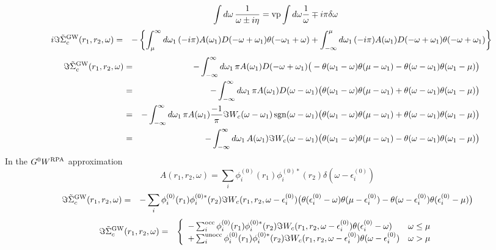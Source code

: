 \documentclass[fleqn]{article}
\begin{document}
\[
  \qquad
    \int d\omega \, \frac{1}{\omega \pm i\eta} = {\rm vp} \int d\omega \frac{1}{\omega} \mp i \pi \delta{\omega}
\]
\begin{eqnarray*}
  \quad
  i \Im \tilde{\Sigma}^{\rm GW}_c(r_1,r_2,\omega) &=& - \left\{
  \int^{\infty}_{\mu} d\omega_1 \, (-i \pi) A(\omega_1) D(-\omega+\omega_1) \theta(-\omega_1+\omega) +
  \int^\mu_{-\infty} d\omega_1 \, (-i \pi) A(\omega_1) D(-\omega+\omega_1) \theta(-\omega+\omega_1) \right\}
\end{eqnarray*}
\begin{eqnarray*}
  \quad
  \Im \tilde{\Sigma}^{\rm GW}_c(r_1,r_2,\omega) &=& -
  \int_{-\infty}^\infty d\omega_1 \, \pi A(\omega_1) D(-\omega+\omega_1)
  \big(
  -\theta(\omega_1-\omega) \theta(\mu-\omega_1) - \theta(\omega-\omega_1) \theta(\omega_1-\mu)
  \big)
  \\ &=& -
  \int_{-\infty}^\infty d\omega_1 \, \pi A(\omega_1) D(\omega-\omega_1)
  \big(
  \theta(\omega_1-\omega) \theta(\mu-\omega_1) + \theta(\omega-\omega_1) \theta(\omega_1-\mu)
  \big)
  \\ &=&
  - \int_{-\infty}^\infty d\omega_1 \, \pi A(\omega_1)
  \frac{-1}{\pi} \Im W_c(\omega-\omega_1) \mathrm{\, sgn}(\omega-\omega_1)
  \big(
  \theta(\omega_1-\omega) \theta(\mu-\omega_1) + \theta(\omega-\omega_1) \theta(\omega_1-\mu)
  \big)
  \\ &=&
  - \int_{-\infty}^\infty d\omega_1 \, A(\omega_1) \Im W_c(\omega-\omega_1)
  \big(
  \theta(\omega_1-\omega) \theta(\mu-\omega_1) - \theta(\omega-\omega_1) \theta(\omega_1-\mu)
  \big)
\end{eqnarray*}
In the $G^0W^{\rm RPA}$ approximation
\[
  A(r_1,r_2,\omega) = \sum_i \phi_i^{(0)}(r_1) \phi_i^{(0)*}(r_2) \delta(\omega-\epsilon_i^{(0)})
\]
\begin{eqnarray*}
  \Im \tilde{\Sigma}^{\rm GW}_c(r_1,r_2,\omega) &=&
  - \sum_i \phi_i^{(0)}(r_1) \phi_i^{(0)*}(r_2) \Im W_c(r_1,r_2,\omega-\epsilon_i^{(0)})
  \big( \theta(\epsilon_i^{(0)}-\omega) \theta(\mu-\epsilon_i^{(0)})
  - \theta(\omega-\epsilon_i^{(0)}) \theta(\epsilon_i^{(0)}-\mu) \big)
\end{eqnarray*}
\begin{eqnarray*}
  \Im \tilde{\Sigma}^{\rm GW}_c(r_1,r_2,\omega) &=&
  \left\{ \begin{array}{ll}
  - \sum_i^{\rm occ} \phi_i^{(0)}(r_1) \phi_i^{(0)*}(r_2) \Im W_c(r_1,r_2,\omega-\epsilon_i^{(0)})
  \theta(\epsilon_i^{(0)}-\omega) & \omega \le \mu \\
  + \sum_i^{\rm unocc} \phi_i^{(0)}(r_1) \phi_i^{(0)*}(r_2) \Im W_c(r_1,r_2,\omega-\epsilon_i^{(0)})
  \theta(\omega-\epsilon_i^{(0)}) & \omega > \mu
  \end{array} \right.
\end{eqnarray*}
\end{document}
